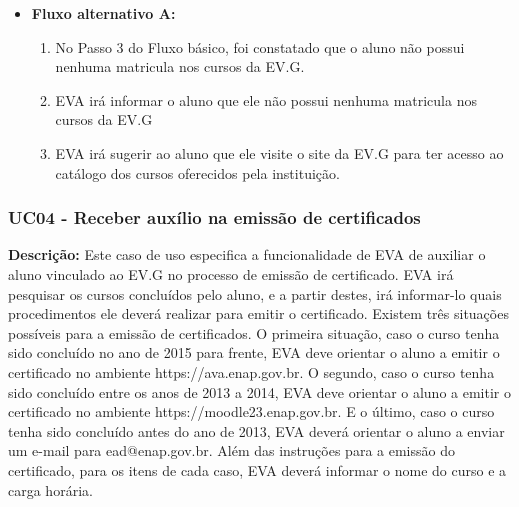 \begin{itemize}
\begin{enumerate}
        \end{enumerate}
    \item \textbf{Fluxo alternativo A:}
        \begin{enumerate}
            \item No Passo 3 do Fluxo básico, foi constatado que o aluno não possui nenhuma matricula nos cursos da EV.G.
            \item EVA irá informar o aluno que ele não possui nenhuma matricula nos cursos da EV.G
            \item EVA irá sugerir ao aluno que ele visite o site da EV.G para ter acesso ao catálogo dos cursos oferecidos pela instituição.
        \end{enumerate}
\end{itemize}


\subsubsection{UC04 - Receber auxílio na emissão de certificados}
\textbf{Descrição:} Este caso de uso especifica a funcionalidade de EVA de auxiliar o aluno vinculado ao EV.G no processo de emissão de certificado. EVA irá pesquisar os cursos concluídos pelo aluno, e a partir destes, irá informar-lo quais procedimentos ele deverá realizar para emitir o certificado. Existem três situações possíveis para a emissão de certificados. O primeira situação, caso o curso tenha sido concluído no ano de 2015 para frente, EVA deve orientar o aluno a emitir o certificado no ambiente https://ava.enap.gov.br. O segundo, caso o curso tenha sido concluído entre os anos de 2013 a 2014, EVA deve orientar o aluno a emitir o certificado no ambiente https://moodle23.enap.gov.br. E o último, caso o curso tenha sido concluído antes do ano de 2013, EVA deverá orientar o aluno a enviar um e-mail para ead@enap.gov.br. Além das instruções para a emissão do certificado, para os itens de cada caso, EVA deverá informar o nome do curso e a carga horária.

